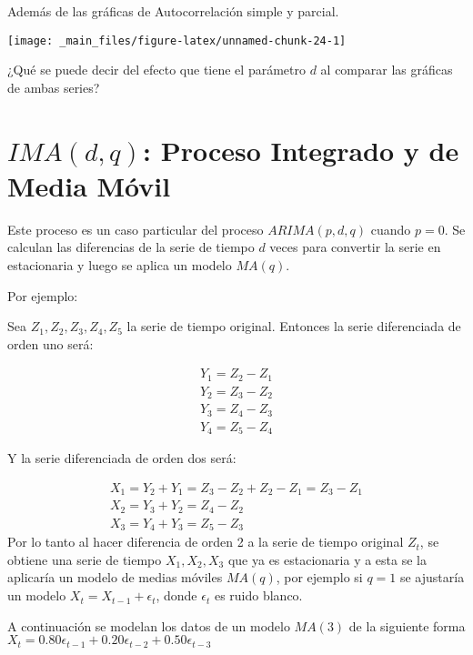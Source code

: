 \documentclass[
  a4paper,
  oneside,
  openany]{book}
\begin{document}
Además de las gráficas de Autocorrelación simple y parcial.

\begin{center}\texttt{[image: \_main\_files/figure-latex/unnamed-chunk-24-1]} \end{center}

¿Qué se puede decir del efecto que tiene el parámetro \(d\) al comparar las gráficas de ambas series?

\hypertarget{imadq-proceso-integrado-y-de-media-muxf3vil}{%
\chapter{\texorpdfstring{\(IMA(d,q)\): Proceso Integrado y de Media Móvil}{IMA(d,q): Proceso Integrado y de Media Móvil}}\label{imadq-proceso-integrado-y-de-media-muxf3vil}}

Este proceso es un caso particular del proceso \(ARIMA(p,d,q)\) cuando \(p=0\). Se calculan las diferencias de la serie de tiempo \(d\) veces para convertir la serie en estacionaria y luego se aplica un modelo \(MA(q)\).

Por ejemplo:

Sea \(Z_1, Z_2, Z_3, Z_4, Z_5\) la serie de tiempo original. Entonces la serie diferenciada de orden uno será:

\[
\begin{array}{c}
Y_1=Z_2-Z_1\\
Y_2=Z_3-Z_2\\
Y_3=Z_4-Z_3\\
Y_4=Z_5-Z_4
\end{array}
\]

Y la serie diferenciada de orden dos será:

\[
\begin{split}
X_1=Y_2+Y_1=Z_3-Z_2+Z_2-Z_1=Z_3-Z_1\\
X_2=Y_3+Y_2=Z_4-Z_2\\
X_3=Y_4+Y_3=Z_5-Z_3
\end{split}
\]
Por lo tanto al hacer diferencia de orden 2 a la serie de tiempo original \(Z_t\), se obtiene una serie de tiempo \(X_1, X_2, X_3\) que ya es estacionaria y a esta se la aplicaría un modelo de medias móviles \(MA(q)\), por ejemplo si \(q=1\) se ajustaría un modelo \(X_t=X_{t-1}+\epsilon_t\), donde \(\epsilon_t\) es ruido blanco.

A continuación se modelan los datos de un modelo \(MA(3)\) de la siguiente forma \(X_t=0.80\epsilon_{t-1}+0.20\epsilon_{t-2}+0.50\epsilon_{t-3}\)
\end{document}
